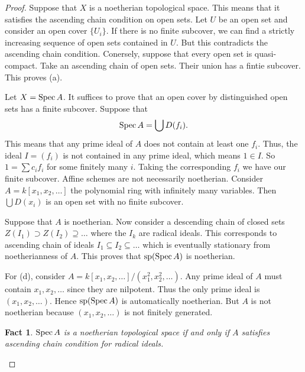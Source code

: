 \documentclass[]{pcmi}
\theoremstyle{plain}
\newtheorem{Fact}[equation]{Fact}
\theoremstyle{definition}
\theoremstyle{remark}
\begin{document}
\begin{proof}
    Suppose that $X$ is a noetherian topological space. This means that it satisfies the ascending chain condition on open sets. Let $U$ be an open set and consider an open cover $\{U_i\}$. If there is no finite subcover, we can find a strictly increasing sequence of open sets contained in $U$. But this contradicts the ascending chain condition. Conersely, suppose that every open set is quasi-compact. Take an ascending chain of open sets. Their union has a fintie subcover. This proves (a). 

    Let $X = \operatorname{Spec} A$. It suffices to prove that an open cover by distinguished open sets has a finite subcover. Suppose that 
    \[
        \operatorname{Spec} A = \bigcup D(f_i). 
    \]
    This means that any prime ideal of $A$ does not contain at least one $f_i$. Thus, the ideal $I = (f_i)$ is not contained in any prime ideal, which means $1 \in I$. So $1 = \sum c_i f_i$ for some finitely many $i$. Taking the corresponding $f_i$ we have our finite subcover. Affine schemes are not necessarily noetherian. Consider $A = k[x_1, x_2, \ldots]$ the polynomial ring with infinitely many variables. Then $\bigcup D(x_i)$ is an open set with no finite subcover. 

    Suppose that $A$ is noetherian. Now consider a descending chain of closed sets $Z(I_1) \supset Z(I_2) \supseteq \ldots$ where the $I_k$ are radical ideals. This corresponds to ascending chain of ideals $I_1 \subseteq I_2 \subseteq \ldots$ which is eventually stationary from noetherianness of $A$. This proves that $\operatorname{sp}(\operatorname{Spec} A)$ is noetherian. 

    For (d), consider $A = k[x_1, x_2, \ldots ] / (x_1^2, x_2^2, \ldots)$. Any prime ideal of $A$ must contain $x_1, x_2, \ldots$ since they are nilpotent. Thus the only prime ideal is $(x_1, x_2, \ldots)$. Hence $\operatorname{sp}(\operatorname{Spec} A)$ is automatically noetherian. But $A$ is not noetherian because $(x_1, x_2, \ldots)$ is not finitely generated. 


    \begin{Fact}
        $\operatorname{Spec} A$ is a noetherian topological space if and only if $A$ satisfies ascending chain condition for radical ideals. 
    \end{Fact}
\end{proof}
\end{document}

